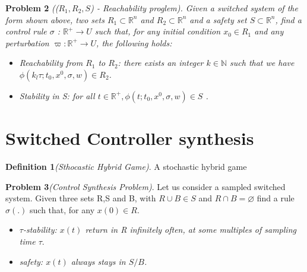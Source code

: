  
 \textbf{Problem 2} \emph{((${R_1,R_2,S}$) - Reachability proglem). Given a switched system of the form shown above, two sets  ${ R_1 \subset \mathbb{R}^n}$  and ${ R_2 \subset \mathbb{R}^n}$ and a safety set  ${S \subset  \mathbb{R}^n}$, find a control rule ${\sigma}$ : ${\mathbb{R}^+\rightarrow U}$ such that, for any initial condition ${x_0  \in  R_1}$ and any perturbation  ${\varpi : \mathbb{R}^+  \rightarrow U}$, the following holds:}
 
 \begin{itemize}
    \item  \emph{Reachability from ${R_1}$ to ${R_2}$: there exists an integer  ${k \in \mathbb{N} }$ such that we have ${ \phi( k_l\tau;t_0,x^0,\sigma,w) \in R_2 }$.}
    
    \item \emph{ Stability in S: for all ${ t \in \mathbb{R}^+, \phi(t;t_0,x^0,\sigma,w) \in S}$ .}
\end{itemize}
 
 \section{Switched Controller synthesis}

\textbf{Definition 1}\emph{(Sthocastic Hybrid Game)}. A stochastic hybrid game 
 
\textbf{Problem 3}\emph{(Control Synthesis Problem)}. Let us consider a sampled switched system. Given three sets R,S and B, with ${R \cup B \in S}$  and ${R \cap B = \varnothing }$ find a rule ${\sigma(.)}$ such that, for any ${x(0) \in R }$. 
 \begin{itemize}
    \item \emph{ ${\tau}$-stability: ${x(t)}$ return in R infinitely often, at some multiples of sampling time ${\tau}$}.
    \item \emph{ safety: ${x(t)}$ always stays in ${S/B}$.}
\end{itemize}




